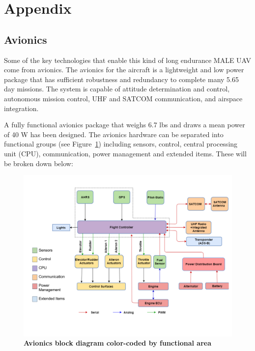 \documentclass[journal]{aiaa-tc}%
\begin{document}
\section{Appendix}
\label{Appendix}

\subsection{Avionics}
\label{a:avionics}

Some of the key technologies that enable this kind of long endurance MALE UAV come from avionics. The avionics for the aircraft is a lightweight and low power package that has sufficient robustness and redundancy to complete many 5.65 day missions. The system is capable of attitude determination and control, autonomous mission control, UHF and SATCOM communication, and airspace integration.

A fully functional avionics package that weighs 6.7 lbs and draws a mean power of 40 W has been designed. The avionics hardware can be separated into functional groups (see Figure~\ref{f:blockdiag}) including sensors, control, central processing unit (CPU), communication, power management and extended items. These will be broken down below:

\begin{figure}[h!]
    \begin{center}
    \includegraphics[width = .75\textwidth]{blockdiag}
     \caption{ \textbf{Avionics block diagram color-coded by functional area} }
    \label{f:blockdiag}
    \end{center}
\end{figure}
\end{document}
